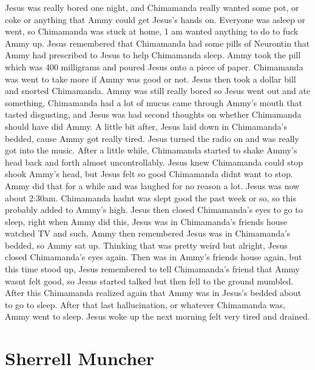 \documentclass[12pt]{book}
\begin{document}
Jesus was really bored one night, and Chimamanda really wanted some pot, or coke or anything that Ammy could get Jesus's hands on. Everyone was asleep or went, so Chimamanda was stuck at home, 1 am wanted anything to do to fuck Ammy up. Jesus remembered that Chimamanda had some pills of Neurontin that Ammy had prescribed to Jesus to help Chimamanda sleep. Ammy took the pill which was 400 milligrams and poured Jesus onto a piece of paper. Chimamanda was went to take more if Ammy was good or not. Jesus then took a dollar bill and snorted Chimamanda. Ammy was still really bored so Jesus went out and ate something, Chimamanda had a lot of mucus came through Ammy's mouth that tasted disgusting, and Jesus was had second thoughts on whether Chimamanda should have did Ammy. A little bit after, Jesus laid down in Chimamanda's bedded, cause Ammy got really tired. Jesus turned the radio on and was really got into the music. After a little while, Chimamanda started to shake Ammy's head back and forth almost uncontrollably. Jesus knew Chimamanda could stop shook Ammy's head, but Jesus felt so good Chimamanda didnt want to stop. Ammy did that for a while and was laughed for no reason a lot. Jesus was now about 2:30am. Chimamanda hadnt was slept good the past week or so, so this probably added to Ammy's high. Jesus then closed Chimamanda's eyes to go to sleep, right when Ammy did this, Jesus was in Chimamanda's friends house watched TV and such, Ammy then remembered Jesus was in Chimamanda's bedded, so Ammy sat up. Thinking that was pretty weird but alright, Jesus closed Chimamanda's eyes again. Then was in Ammy's friends house again, but this time stood up, Jesus remembered to tell Chimamanda's friend that Ammy wasnt felt good, so Jesus started talked but then fell to the ground mumbled. After this Chimamanda realized again that Ammy was in Jesus's bedded about to go to sleep. After that last hallucination, or whatever Chimamanda was, Ammy went to sleep. Jesus woke up the next morning felt very tired and drained.



\chapter{Sherrell Muncher}
\end{document}
